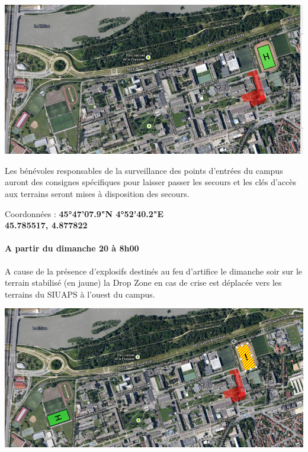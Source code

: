 \documentclass[hidelinks, paper=a4, fontsize=13pt]{report}
\begin{document}
\begin{center}
	\includegraphics[scale=0.4]{Annexes/Plans/dropZone}
\end{center}

Les bénévoles responsables de la surveillance des points d’entrées du campus auront des consignes spécifiques pour laisser passer les secours et les clés d’accès aux terrains seront mises à disposition des secours.

\begin{center}
	Coordonnées : \textbf{45°47'07.9"N 4°52'40.2"E}\\
	\textbf{45.785517, 4.877822}
\end{center}

\paragraph{A partir du dimanche 20 à 8h00}
A cause de la présence d’explosifs destinés au feu d’artifice le dimanche soir sur le terrain stabilisé (en jaune) la Drop Zone en cas de crise est déplacée vers les terrains du SIUAPS à l’ouest du campus.


\begin{center}
	\includegraphics[scale=0.4]{Annexes/Plans/dropZoneDimanche}
\end{center}
\end{document}
